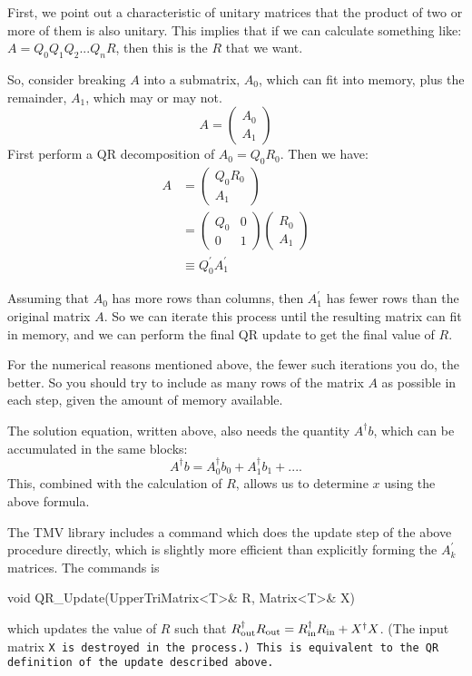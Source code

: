 First, we point out a characteristic of unitary matrices that the product 
of two or more of them is also unitary.  
This implies that if we can calculate
something like: $A = Q_0 Q_1 Q_2 ... Q_n R$, then this is the $R$ that we want.

So, consider breaking $A$ into a submatrix, $A_0$, which can fit into memory, 
plus the remainder, $A_1$, which may or may not.
\begin{equation*}
A = \left(\begin{array}{c}A_0 \\A_1\end{array}\right)
\end{equation*}
First perform a QR decomposition of $A_0 = Q_0 R_0$.  Then we have:
\begin{align*}
A &= \left(\begin{array}{c}Q_0 R_0 \\ A_1 \end{array}\right) \\
&= \left(\begin{array}{cc}Q_0 & 0 \\ 0 & 1\end{array}\right) 
      \left(\begin{array}{c}R_0 \\ A_1 \end{array}\right) \\
&\equiv Q_0^\prime A_1^\prime
\end{align*}

Assuming that $A_0$ has more rows than columns, 
then $A_1^\prime$ has fewer rows than
the original matrix $A$.  So we can iterate this process until the 
resulting matrix can fit in memory, and we can perform the final QR update
to get the final value of $R$.

For the numerical reasons mentioned above, 
the fewer such iterations you do, the better.  So you should try to include as many
rows of the matrix $A$ as possible in each step, given the amount of memory
available.

The solution equation, written above, also needs the quantity $A^\dagger b$, which
can be accumulated in the same blocks:
\begin{equation*}
A^\dagger b = A_0^\dagger b_0 + A_1^\dagger b_1 + ....
\end{equation*}
This, combined with the calculation of $R$, allows us to determine $x$ using the above formula.

The TMV library includes a command which does the update step of the above procedure
directly, which is slightly more efficient than explicitly forming the $A_k^\prime$ matrices.
The commands is
\begin{tmvcode}
void QR_Update(UpperTriMatrix<T>& R, Matrix<T>& X)
\end{tmvcode}
which updates the value of $R$ such that $R_{\rm out}^\dagger R_{\rm out} =
R_{\rm in}^\dagger R_{\rm in} + X^\dagger X$.
(The input matrix \tt{X} is destroyed in the process.)  This is equivalent to the QR
definition of the update described above.

